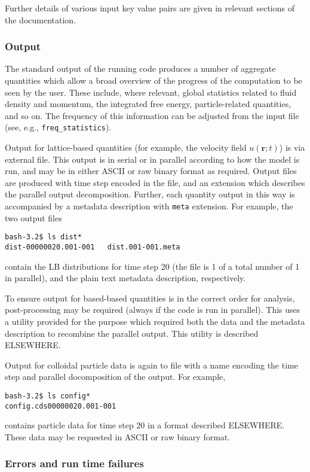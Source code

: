 Further details of various input key value pairs are given in
relevant sections of the documentation.

\subsubsection{Output}

The standard output of the running code produces a number of
aggregate quantities which allow a broad overview of the progress
of the computation to be seen by the user. These include, where
relevant, global statistics related to fluid density and momentum,
the integrated free energy, particle-related quantities, and so on.
The frequency of this information can be adjusted from the input
file (see, e.g., \texttt{freq\_statistics}).

Output for lattice-based quantities (for example, the velocity field
$u(\mathbf{r}; t)$) is via external file. This output is in serial
or in parallel according to how the model is run, and may be in
either ASCII or raw binary format as required. Output files are produced
with time step encoded in the file, and an extension which describes the
parallel output decomposition. Further, each quantity output in this way
is accompanied by a metadata description with \texttt{meta} extension.
For example, the two output files
\begin{lstlisting}
bash-3.2$ ls dist*
dist-00000020.001-001   dist.001-001.meta
\end{lstlisting}
contain the LB distributions for time step 20 (the file is 1 of a total
number of 1 in parallel), and the plain text metadata description,
respectively.

To ensure output for based-based quantities is in the correct order for
analysis, post-processing
may be required (always if the code is run in parallel). This uses a utility
provided for the purpose which required both the data and the metadata
description to recombine the parallel output. This utility is described
ELSEWHERE.

Output for colloidal particle data is again to file with a name encoding
the time step and parallel docomposition of the output. For example,
\begin{lstlisting}
bash-3.2$ ls config*
config.cds00000020.001-001
\end{lstlisting}
contains particle data for time step 20 in a format described ELSEWHERE.
These data may be requested in ASCII or raw binary format.

\subsubsection{Errors and run time failures}

